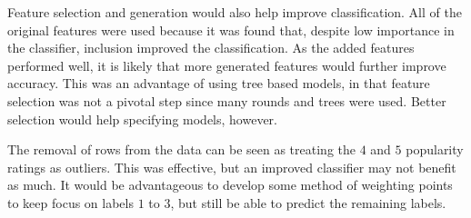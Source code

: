 \documentclass[onecolumn,prl,aps,10pt]{revtex4}
\begin{document}
Feature selection and generation would also help improve classification. All of the original features were used because it was found that, despite low importance in the classifier, inclusion improved the classification. As the added features performed well,  it is likely that more generated features would further improve accuracy. This was an advantage of using tree based models, in that feature selection was not a pivotal step since many rounds and trees were used. Better selection would help specifying models, however.

The removal of rows from the data can be seen as treating the $4$ and $5$ popularity ratings as outliers. This was effective, but an improved classifier may not benefit as much. It would be advantageous to develop some method of weighting points to keep focus on labels $1$ to $3$, but still be able to predict the remaining labels.
\end{document}
